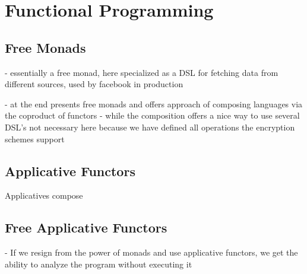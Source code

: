 \section{Functional Programming}
\label{sec:funct-progr}

\subsection{Free Monads}
\label{sec:free-monads}

\cite{Haxl}
- essentially a free monad, here specialized as a DSL for fetching
data from different sources, used by facebook in production

\cite{DataTypesALaCarte}
- at the end presents free monads and offers approach of composing
  languages via the coproduct of functors
- while the composition offers a nice way to use several DSL's not
  necessary here because we have defined all operations the encryption
  schemes support

\subsection{Applicative Functors}
\label{sec:applicative-functors}

Applicatives compose \cite{EssenceIterator}

\subsection{Free Applicative Functors}
\label{sec:free-appl-funct}

- If we resign from the power of monads and use applicative functors,
  we get the ability to analyze the program without executing it
\cite{FreeApplicatives}

